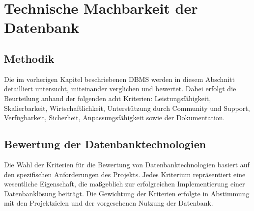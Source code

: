 \section{Technische Machbarkeit der Datenbank}
\subsection{Methodik}

Die im vorherigen Kapitel beschriebenen DBMS werden in diesem Abschnitt detailliert untersucht, miteinander verglichen und bewertet. Dabei erfolgt die Beurteilung anhand der folgenden acht Kriterien: Leistungsfähigkeit, Skalierbarkeit, Wirtschaftlichkeit, Unterstützung durch Community und Support, Verfügbarkeit, Sicherheit, Anpassungsfähigkeit sowie der Dokumentation.

\subsection{Bewertung der Datenbanktechnologien}

Die Wahl der Kriterien für die Bewertung von Datenbanktechnologien basiert auf den spezifischen Anforderungen des Projekts. Jedes Kriterium repräsentiert eine wesentliche Eigenschaft, die maßgeblich zur erfolgreichen Implementierung einer Datenbanklösung beiträgt. Die Gewichtung der Kriterien erfolgte in Abstimmung mit den Projektzielen und der vorgesehenen Nutzung der Datenbank.

